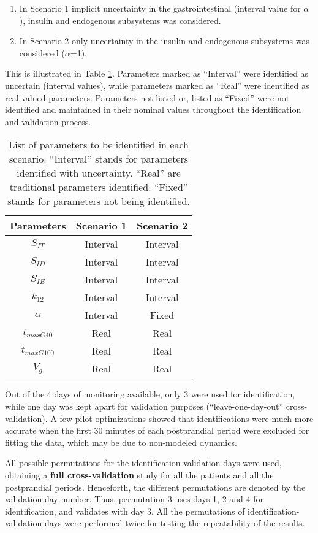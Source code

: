 \begin{enumerate}
	\item In Scenario 1 implicit uncertainty in the gastrointestinal (interval value for $\alpha$), insulin and endogenous subsystems was considered.
	\item In Scenario 2 only uncertainty in the insulin and endogenous subsystems was considered ($\alpha$=1).
\end{enumerate}

This is illustrated in Table \ref{tab:listparameters}. Parameters marked as ``Interval''  were identified as uncertain (interval values), while parameters marked as ``Real'' were identified as real-valued parameters. Parameters not listed or, listed as ``Fixed'' were not identified and maintained in their nominal values throughout the identification and validation process.

\begin{table}[hbtp]
	\centering
	\begin{tabular}{| c | c | c |}
	\hline
	\textbf{Parameters} & \textbf{Scenario 1} & \textbf{Scenario 2} \\
	\hline
	$S_{IT}$ & Interval & Interval \\
  $S_{ID}$ & Interval & Interval \\
	$S_{IE}$ & Interval & Interval \\
	$k_{12}$ & Interval & Interval \\
	$\alpha$ & Interval & Fixed \\
	$t_{maxG40}$ & Real & Real \\
	$t_{maxG100}$ & Real & Real \\	
	$V_g$ & Real & Real \\		
	\hline 
	\end{tabular}
\caption{List of parameters to be identified in each scenario. ``Interval'' stands for parameters identified with uncertainty. ``Real'' are traditional parameters identified. ``Fixed'' stands for parameters not being identified.}
\label{tab:listparameters}
\end{table}
	
Out of the 4 days of monitoring available, only 3 were used for identification, while one day was kept apart for validation purposes (``leave-one-day-out'' cross-validation). A few pilot optimizations showed that identifications were much more accurate when the first 30 minutes of each postprandial period were excluded for fitting the data, which may be due to non-modeled dynamics.

All possible permutations for the identification-validation days were used, obtaining a \textbf{full cross-validation} study for all the patients and all the postprandial periods. Henceforth, the different permutations are denoted by the validation day number. Thus, permutation 3 uses days 1, 2 and 4 for identification, and validates with day 3. All the permutations of identification-validation days were performed twice for testing the repeatability of the results.

